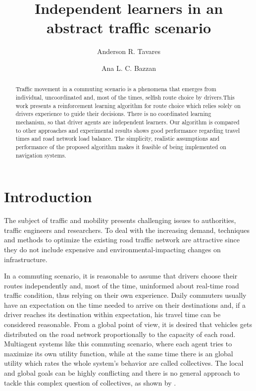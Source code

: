 \documentclass[12pt]{llncs}
\title{Independent learners in an abstract traffic scenario}
\author{
  Anderson R. Tavares\inst{1} \and Ana L. C. Bazzan\inst{1}
}
\institute{Instituto de Inform\'atica -- Universidade Federal do Rio Grande do Sul
  (UFRGS)\\
  Caixa Postal 15.064 -- 91.501-970 -- Porto Alegre -- RS -- Brazil
  \email{\{artavares,bazzan\}@inf.ufrgs.br}
}
\begin{document}
\maketitle

\begin{abstract}
Traffic movement in a commuting scenario is a phenomena that emerges from individual, uncoordinated and, most of the times, selfish route choice by drivers.This work presents a reinforcement learning algorithm for route choice which relies solely on drivers experience to guide their decisions. There is no coordinated learning mechanism, so that driver agents are independent learners. Our algorithm is compared to other approaches and experimental results shows good performance regarding travel times and road network load balance. The simplicity, realistic assumptions and performance of the proposed algorithm makes it feasible of being implemented on navigation systems.
\end{abstract}





\section{Introduction}
\label{sec:intro}

The subject of traffic and mobility presents challenging issues to authorities, traffic engineers and researchers. To deal with the increasing demand, techniques and methods to optimize the existing road traffic network are attractive since they do not include expensive and environmental-impacting changes on infrastructure.

In a commuting scenario, it is reasonable to assume that drivers choose their routes independently and, most of the time, uninformed about real-time road traffic condition, thus relying on their own experience. Daily commuters usually have an expectation on the time needed to arrive on their destinations and, if a driver reaches its destination within expectation, his travel time can be considered  reasonable. From a global point of view, it is desired that vehicles gets distributed on the road network proportionally to the capacity of each road. Multiagent systems like this commuting scenario, where each agent tries to maximize its own utility function, while at the same time there is an global utility which rates the whole system's behavior are called collectives. The local and global goals can be highly conflicting and there is no general approach to tackle this complex question of collectives, as shown by \cite{Tumer&Wolpert2004}.
\end{document}
